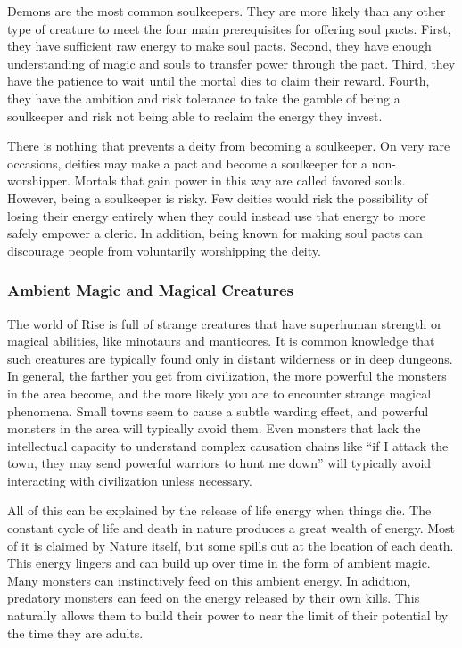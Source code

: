       Demons are the most common soulkeepers.
      They are more likely than any other type of creature to meet the four main prerequisites for offering soul pacts.
      First, they have sufficient raw energy to make soul pacts.
      Second, they have enough understanding of magic and souls to transfer power through the pact.
      Third, they have the patience to wait until the mortal dies to claim their reward.
      Fourth, they have the ambition and risk tolerance to take the gamble of being a soulkeeper and risk not being able to reclaim the energy they invest.

      There is nothing that prevents a deity from becoming a soulkeeper.
      On very rare occasions, deities may make a pact and become a soulkeeper for a non-worshipper.
      Mortals that gain power in this way are called favored souls.
      However, being a soulkeeper is risky.
      Few deities would risk the possibility of losing their energy entirely when they could instead use that energy to more safely empower a cleric.
      In addition, being known for making soul pacts can discourage people from voluntarily worshipping the deity.

    \subsubsection{Ambient Magic and Magical Creatures}
      The world of Rise is full of strange creatures that have superhuman strength or magical abilities, like minotaurs and manticores.
      It is common knowledge that such creatures are typically found only in distant wilderness or in deep dungeons.
      In general, the farther you get from civilization, the more powerful the monsters in the area become, and the more likely you are to encounter strange magical phenomena.
      Small towns seem to cause a subtle warding effect, and powerful monsters in the area will typically avoid them.
      Even monsters that lack the intellectual capacity to understand complex causation chains like ``if I attack the town, they may send powerful warriors to hunt me down'' will typically avoid interacting with civilization unless necessary.

      All of this can be explained by the release of life energy when things die.
      The constant cycle of life and death in nature produces a great wealth of energy.
      Most of it is claimed by Nature itself, but some spills out at the location of each death.
      This energy lingers and can build up over time in the form of ambient magic.
      Many monsters can instinctively feed on this ambient energy.
      In adidtion, predatory monsters can feed on the energy released by their own kills.
      This naturally allows them to build their power to near the limit of their potential by the time they are adults.

